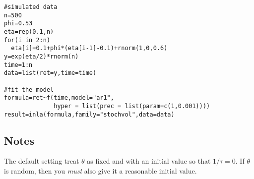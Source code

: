 \documentclass[a4paper,11pt]{article}
\begin{document}
\begin{verbatim}
#simulated data
n=500
phi=0.53
eta=rep(0.1,n)
for(i in 2:n)
  eta[i]=0.1+phi*(eta[i-1]-0.1)+rnorm(1,0,0.6)
y=exp(eta/2)*rnorm(n)
time=1:n
data=list(ret=y,time=time)

#fit the model
formula=ret~f(time,model="ar1",
              hyper = list(prec = list(param=c(1,0.001))))
result=inla(formula,family="stochvol",data=data)

\end{verbatim}

\subsection*{Notes}

The default setting treat $\theta$ as fixed and with an initial value
so that $1/\tau=0$.  If $\theta$ is random, then you \emph{must} also
give it a reasonable initial value.
\end{document}
